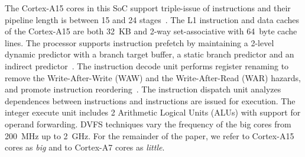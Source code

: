 The Cortex-A15 cores in this SoC support triple-issue of instructions and their pipeline length is between 15 and 24 stages~\cite{MPR_A15}. The L1 instruction and data caches of the Cortex-A15 are both 32~KB and 2-way set-associative with 64~byte cache lines. The processor supports instruction prefetch by maintaining a 2-level dynamic predictor with a branch target buffer, a static branch predictor and an indirect predictor~\cite{TRM_A15}. The instruction decode unit performs register renaming to remove the Write-After-Write (WAW) and the Write-After-Read (WAR) hazards, and promote instruction reordering~\cite{TRM_A15}. The instruction dispatch unit analyzes dependences between instructions and instructions are issued for execution.  The integer execute unit includes 2 Arithmetic Logical Units (ALUs) with support for operand forwarding. DVFS techniques vary the frequency of the big cores from 200~MHz up to 2~GHz.
For the remainder of the paper, we refer to Cortex-A15 cores as \textit{big} and to Cortex-A7 cores as \textit{little}.








